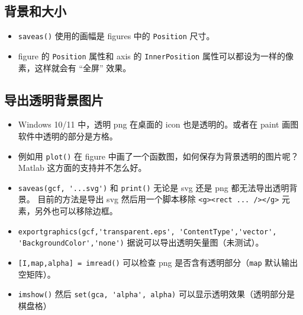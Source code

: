 
\subsection{背景和大小}
\begin{itemize}
\item \verb`saveas()` 使用的画幅是 figures 中的 \verb`Position` 尺寸。
\item figure 的 \verb`Position` 属性和 axis 的 \verb`InnerPosition` 属性可以都设为一样的像素，这样就会有 “全屏” 效果。
\end{itemize}

\subsection{导出透明背景图片}
\begin{itemize}
\item Windows 10/11 中，透明 png 在桌面的 icon 也是透明的。或者在 paint 画图软件中透明的部分是方格。
\item 例如用 \verb`plot()` 在 figure 中画了一个函数图，如何保存为背景透明的图片呢？ Matlab 这方面的支持并不怎么好。
\item \verb`saveas(gcf, '...svg')` 和 \verb`print()` 无论是 svg 还是 png 都无法导出透明背景。 目前的方法是导出 svg 然后用一个脚本移除 \verb`<g><rect ... /></g>` 元素，另外也可以移除边框。
\item \verb`exportgraphics(gcf,'transparent.eps', 'ContentType','vector', 'BackgroundColor','none')` 据说可以导出透明矢量图（未测试）。
\item \verb`[I,map,alpha] = imread()` 可以检查 png 是否含有透明部分（\verb`map` 默认输出空矩阵）。
\item \verb`imshow()` 然后 \verb`set(gca, 'alpha', alpha)` 可以显示透明效果（透明部分是棋盘格）
\end{itemize}
